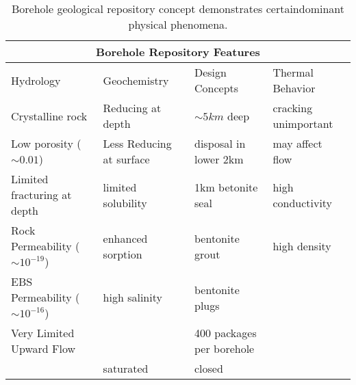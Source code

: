 %
\begin{table}[h!]
  \centering
  \footnotesize{
  \begin{tabularx}{\textwidth}{|X|X|X|X|}
    \multicolumn{4}{c}{\textbf{Borehole Repository Features}}\\
    \hline
    Hydrology & Geochemistry & Design Concepts & Thermal Behavior \\ 
    \hline
    Crystalline rock&Reducing at depth& $\sim5km$ deep & cracking unimportant\\
    Low porosity ($\sim 0.01$)&Less Reducing at surface& disposal in lower 2km &may affect flow\\
    Limited fracturing at depth&limited solubility &1km betonite seal & high conductivity\\
    Rock Permeability ($\sim 10^{-19}$) &enhanced sorption &bentonite grout &high density\\
    EBS Permeability ($\sim 10^{-16}$) &high salinity&bentonite plugs&\\
    Very Limited Upward Flow&&400 packages per borehole&\\
    &saturated&closed&\\
    \hline
  \end{tabularx}
  \caption[Borehole repository features.]{Borehole geological repository 
  concept demonstrates certaindominant physical phenomena. }
  \label{tab:borehole_tab}
  }
\end{table}
